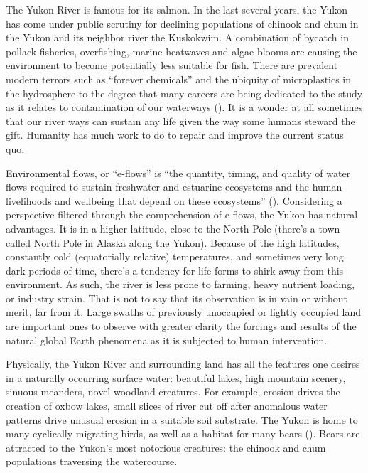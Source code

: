 \begin{refsection}
The Yukon River is famous for its salmon. In the last several years, the Yukon has come under public scrutiny for declining populations of chinook and chum in the Yukon and its neighbor river the Kuskokwim. A combination of bycatch in pollack fisheries, overfishing, marine heatwaves and algae blooms are causing the environment to become potentially less suitable for fish. There are prevalent modern terrors such as “forever chemicals” and the ubiquity of microplastics in the hydrosphere to the degree that many careers are being dedicated to the study as it relates to contamination of our waterways (\cite{schreder2014flame}). It is a wonder at all sometimes that our river ways can sustain any life given the way some humans steward the gift. Humanity has much work to do to repair and improve the current status quo.

Environmental flows, or “e-flows” is “the quantity, timing, and quality of water flows required to sustain freshwater and estuarine ecosystems and the human livelihoods and wellbeing that depend on these ecosystems” (\cite{arthington2018brisbane}). Considering a perspective filtered through the comprehension of e-flows, the Yukon has natural advantages. It is in a higher latitude, close to the North Pole (there’s a town called North Pole in Alaska along the Yukon). Because of the high latitudes, constantly cold (equatorially relative) temperatures, and sometimes very long dark periods of time, there’s a tendency for life forms to shirk away from this environment. As such, the river is less prone to farming, heavy nutrient loading, or industry strain. That is not to say that its observation is in vain or without merit, far from it. Large swaths of previously unoccupied or lightly occupied land are important ones to observe with greater clarity the forcings and results of the natural global Earth phenomena as it is subjected to human intervention.

Physically, the Yukon River and surrounding land has all the features one desires in a naturally occurring surface water: beautiful lakes, high mountain scenery, sinuous meanders, novel woodland creatures. For example, erosion drives the creation of oxbow lakes, small slices of river cut off after anomalous water patterns drive unusual erosion in a suitable soil substrate. The Yukon is home to many cyclically migrating birds, as well as a habitat for many bears (\cite{sierraclubMeetIce}). Bears are attracted to the Yukon’s most notorious creatures: the chinook and chum populations traversing the watercourse. 


\end{refsection}
